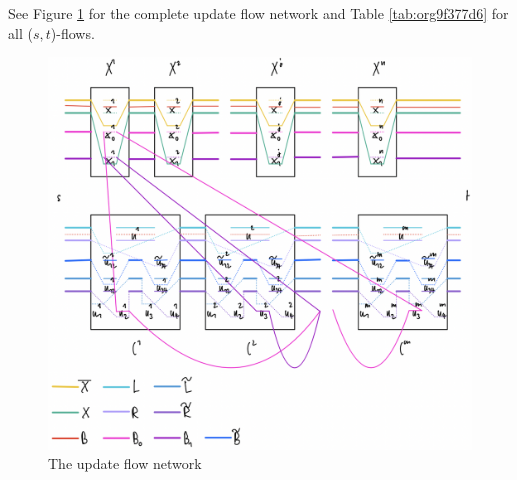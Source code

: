\documentclass[fontsize=11pt,paper=a4]{book}
\begin{document}
See Figure \ref{fig:orgbb5d594} for the complete update flow network and Table \ref{tab:org9f377d6} for all (\(s,t\))-flows.

\begin{figure}[htbp]
\centering
\includegraphics[width=.9\linewidth]{../assets/Screen Shot 2023-02-14 at 15.08.01.png}
\caption{\label{fig:orgbb5d594}The update flow network}
\end{figure}
\end{document}
